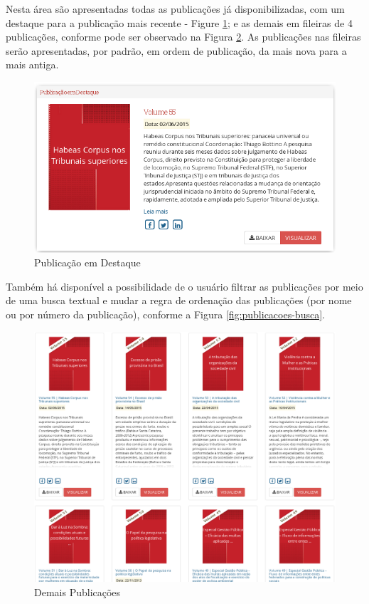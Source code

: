 Nesta área são apresentadas todas as publicações já disponibilizadas, com um destaque para a publicação mais recente - Figure \ref{fig:publicacoes-destaque}; e as demais em fileiras de 4 publicações, conforme pode ser observado na Figura \ref{fig:publicacoes-matriz}. As publicações nas fileiras serão apresentadas, por padrão, em ordem de publicação, da mais nova para a mais antiga.

\begin{figure}[htb]%
	\begin{center}
		\includegraphics[scale=0.44]{./imagens/publicacoes-destaque.png}%
	\end{center}%
	\caption{Publicação em Destaque\label{fig:publicacoes-destaque}}%
\end{figure}%

Também há disponível a possibilidade de o usuário filtrar as publicações por meio de uma busca textual e mudar a regra de ordenação das publicações (por nome ou por número da publicação), conforme a Figura \ref{fig:publicacoes-busca}.

\begin{figure}[htb]%
	\begin{center}
		\includegraphics[scale=0.31]{./imagens/publicacoes-matriz.png}%
	\end{center}%
	\caption{Demais Publicações\label{fig:publicacoes-matriz}}%
\end{figure}%

